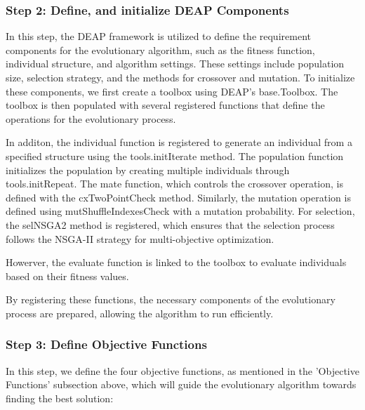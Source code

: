 \subsubsection*{Step 2: Define, and initialize DEAP Components}

In this step, the DEAP framework is utilized to define the requirement components for the evolutionary algorithm, such as the fitness function, individual structure, and algorithm settings. These settings include population size, selection strategy, and the methods for crossover and mutation. To initialize these components, we first create a toolbox using DEAP's base.Toolbox. The toolbox is then populated with several registered functions that define the operations for the evolutionary process.

In additon, the individual function is registered to generate an individual from a specified structure using the tools.initIterate method. The population function initializes the population by creating multiple individuals through tools.initRepeat. The mate function, which controls the crossover operation, is defined with the cxTwoPointCheck method. Similarly, the mutation operation is defined using mutShuffleIndexesCheck with a mutation probability. For selection, the selNSGA2 method is registered, which ensures that the selection process follows the NSGA-II strategy for multi-objective optimization. 

Howerver, the evaluate function is linked to the toolbox to evaluate individuals based on their fitness values.

By registering these functions, the necessary components of the evolutionary process are prepared, allowing the algorithm to run efficiently.


\subsubsection*{Step 3: Define Objective Functions}
In this step, we define the four objective functions, as mentioned in the 'Objective Functions' subsection above, which will guide the evolutionary algorithm towards finding the best solution:

